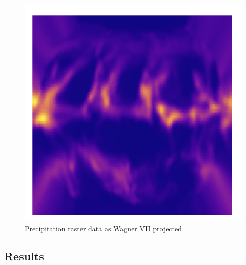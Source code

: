 \begin{figure}[h]
    \begin{minipage}{0.30\textwidth}
        \centering
        \includegraphics[width=0.9\linewidth]{figures/chapter-8/prect_wag.png}
        \caption{Precipitation raster data as Wagner VII projected}
        \label{fig:wag_prect_raster}
    \end{minipage}\hfill
\end{figure}

\subsection{Results}
